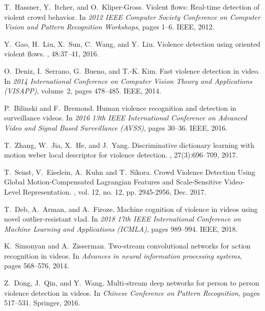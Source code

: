 \documentclass[10pt,twocolumn,letterpaper]{article}
\begin{document}
{\begin{thebibliography}{10}
T.~Hassner, Y.~Itcher, and O.~Kliper-Gross.
\newblock Violent flows: Real-time detection of violent crowd behavior.
\newblock In {\em 2012 IEEE Computer Society Conference on Computer Vision and
	Pattern Recognition Workshops}, pages 1--6. IEEE, 2012.

Y.~Gao, H.~Liu, X.~Sun, C.~Wang, and Y.~Liu.
\newblock Violence detection using oriented violent flows.
, 48:37--41, 2016.

O.~Deniz, I.~Serrano, G.~Bueno, and T.-K. Kim.
\newblock Fast violence detection in video.
\newblock In {\em 2014 International Conference on Computer Vision Theory and
	Applications (VISAPP)}, volume~2, pages 478--485. IEEE, 2014.

P.~Bilinski and F.~Bremond.
\newblock Human violence recognition and detection in surveillance videos.
\newblock In {\em 2016 13th IEEE International Conference on Advanced Video and
	Signal Based Surveillance (AVSS)}, pages 30--36. IEEE, 2016.

T.~Zhang, W.~Jia, X.~He, and J.~Yang.
\newblock Discriminative dictionary learning with motion weber local descriptor
	for violence detection.
,
	27(3):696--709, 2017.

T.~Senst, V.~Eiselein, A.~Kuhn and T.~Sikora.
\newblock Crowd Violence Detection Using Global Motion-Compensated Lagrangian Features and Scale-Sensitive Video-Level Representation.
, vol. 12, no. 12, pp. 2945-2956, Dec. 2017.

T.~Deb, A.~Arman, and A.~Firoze.
\newblock Machine cognition of violence in videos using novel outlier-resistant
	vlad.
\newblock In {\em 2018 17th IEEE International Conference on Machine Learning
	and Applications (ICMLA)}, pages 989--994. IEEE, 2018.

K.~Simonyan and A.~Zisserman.
\newblock Two-stream convolutional networks for action recognition in videos.
\newblock In {\em Advances in neural information processing systems}, pages
	568--576, 2014.

Z.~Dong, J.~Qin, and Y.~Wang.
\newblock Multi-stream deep networks for person to person violence detection in
	videos.
\newblock In {\em Chinese Conference on Pattern Recognition}, pages 517--531.
	Springer, 2016.


\end{thebibliography}}
\end{document}
